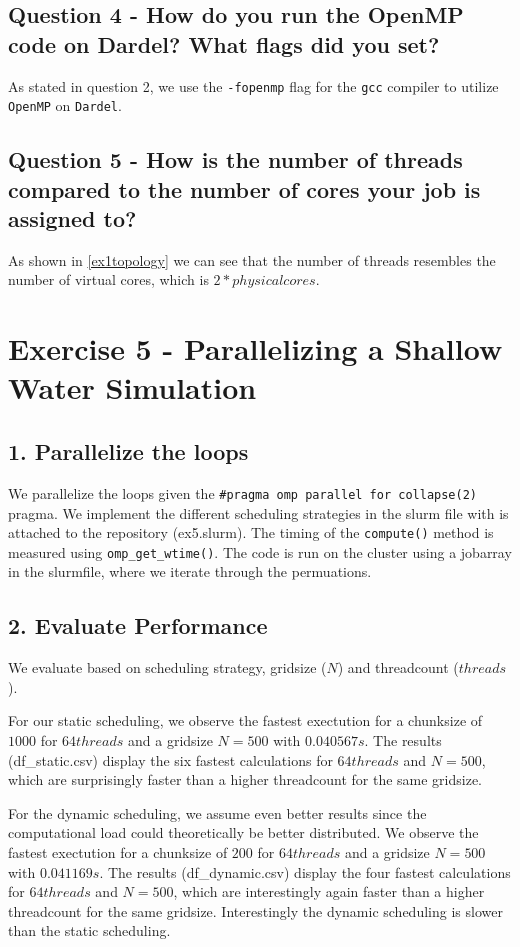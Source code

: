 \documentclass[a4paper,10pt]{article}
\begin{document}
\subsection{Question 4 - How do you run the OpenMP code on Dardel? What flags did you set?}
As stated in question 2, we use the \verb|-fopenmp| flag for the \verb|gcc| compiler to utilize \verb|OpenMP| on \verb|Dardel|.

\subsection{Question 5 - How is the number of threads compared to the number of cores your job is assigned to?}
As shown in \ref{ex1topology} we can see that the number of threads resembles the number of virtual cores, which is $2 * physical cores$.

\section{Exercise 5 - Parallelizing a Shallow Water Simulation}
\subsection{1. Parallelize the loops}
We parallelize the loops given the \verb|#pragma omp parallel for collapse(2)| pragma. 
We implement the different scheduling strategies in the slurm file with is attached to the repository (ex5.slurm).
The timing of the \verb|compute()| method is measured using \verb|omp_get_wtime()|.
The code is run on the cluster using a jobarray in the slurmfile, where we iterate through the permuations.

\subsection{2. Evaluate Performance}
We evaluate based on scheduling strategy, gridsize ($N$) and threadcount ($threads$).

For our static scheduling, we observe the fastest exectution for a chunksize of $ 1000 $ for $64 threads$ and a gridsize $N=500$ with $0.040567 s$.
The results (df_static.csv) display the six fastest calculations for $64 threads$ and $N=500$, which are surprisingly faster than a higher threadcount for the same gridsize.

For the dynamic scheduling, we assume even better results since the computational load could theoretically be better distributed. 
We observe the fastest exectution for a chunksize of $ 200 $ for $64 threads$ and a gridsize $N=500$ with $0.041169 s$.
The results (df_dynamic.csv) display the four fastest calculations for $64 threads$ and $N=500$, which are interestingly again faster than a higher threadcount for the same gridsize.
Interestingly the dynamic scheduling is slower than the static scheduling.
\end{document}
